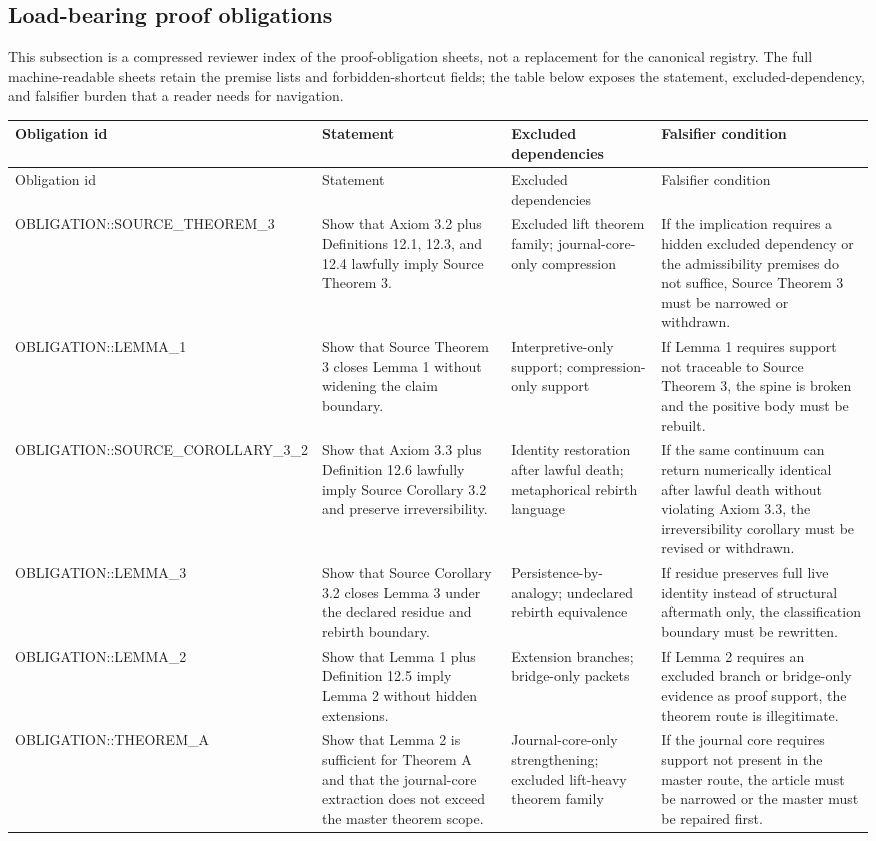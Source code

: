 \subsection{Load-bearing proof obligations}
This subsection is a compressed reviewer index of the proof-obligation sheets,
not a replacement for the canonical registry. The full machine-readable sheets
retain the premise lists and forbidden-shortcut fields; the table below exposes
the statement, excluded-dependency, and falsifier burden that a reader needs
for navigation.
\begin{longtable}{p{}p{}p{}p{}}
\toprule
Obligation id & Statement & Excluded dependencies & Falsifier condition \\
\midrule
\endfirsthead
\toprule
Obligation id & Statement & Excluded dependencies & Falsifier condition \\
\midrule
\endhead
OBLIGATION::SOURCE\_THEOREM\_3 & Show that Axiom 3.2 plus Definitions 12.1, 12.3, and 12.4 lawfully imply Source Theorem 3. & Excluded lift theorem family; journal-core-only compression & If the implication requires a hidden excluded dependency or the admissibility premises do not suffice, Source Theorem 3 must be narrowed or withdrawn. \\
OBLIGATION::LEMMA\_1 & Show that Source Theorem 3 closes Lemma 1 without widening the claim boundary. & Interpretive-only support; compression-only support & If Lemma 1 requires support not traceable to Source Theorem 3, the spine is broken and the positive body must be rebuilt. \\
OBLIGATION::SOURCE\_COROLLARY\_3\_2 & Show that Axiom 3.3 plus Definition 12.6 lawfully imply Source Corollary 3.2 and preserve irreversibility. & Identity restoration after lawful death; metaphorical rebirth language & If the same continuum can return numerically identical after lawful death without violating Axiom 3.3, the irreversibility corollary must be revised or withdrawn. \\
OBLIGATION::LEMMA\_3 & Show that Source Corollary 3.2 closes Lemma 3 under the declared residue and rebirth boundary. & Persistence-by-analogy; undeclared rebirth equivalence & If residue preserves full live identity instead of structural aftermath only, the classification boundary must be rewritten. \\
OBLIGATION::LEMMA\_2 & Show that Lemma 1 plus Definition 12.5 imply Lemma 2 without hidden extensions. & Extension branches; bridge-only packets & If Lemma 2 requires an excluded branch or bridge-only evidence as proof support, the theorem route is illegitimate. \\
OBLIGATION::THEOREM\_A & Show that Lemma 2 is sufficient for Theorem A and that the journal-core extraction does not exceed the master theorem scope. & Journal-core-only strengthening; excluded lift-heavy theorem family & If the journal core requires support not present in the master route, the article must be narrowed or the master must be repaired first. \\
\bottomrule
\end{longtable}

